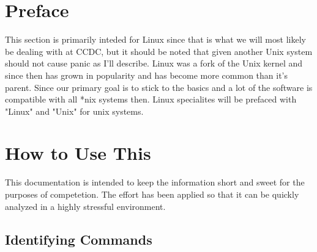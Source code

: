 %
%



\section{Preface}
  This section is primarily inteded for Linux since that is what we will most likely be dealing with at CCDC, but it should be noted that given another Unix system should not cause panic as I'll describe. Linux was a fork of the Unix kernel and since then has grown in popularity and has become more common than it's parent. Since our primary goal is to stick to the basics and a lot of the software is compatible with all *nix systems then. Linux specialites will be prefaced with "Linux" and "Unix" for unix systems.

\section{How to Use This}
  This documentation is intended to keep the information short and sweet for the purposes of competetion. The effort has been applied so that it can be quickly analyzed in a highly stressful environment.

  \subsection{Identifying Commands}
  
